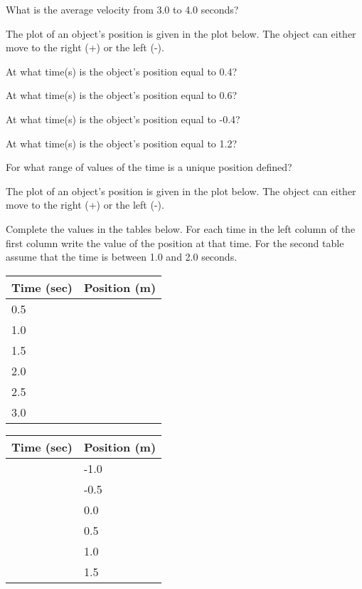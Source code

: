 \begin{problem}
\begin{subproblem}
    \item What is the average velocity from 3.0 to 4.0  seconds?
      \vspace{3em}
    \end{subproblem}

    \clearpage

  \item The plot of an object's position is given in the plot
    below. The object can either move to the right (+) or the left
    (-).

    \scalebox{0.4}{}

    \begin{subproblem}
    \item At what time(s) is the object's position equal to 0.4?
      \vfill
    \item At what time(s) is the object's position equal to 0.6?
      \vfill
    \item At what time(s) is the object's position equal to -0.4?
      \vfill
    \item At what time(s) is the object's position equal to 1.2?
      \vfill
    \item For what range of values of the time is a unique position
      defined?  
      \vfill
    \end{subproblem}

    \clearpage

  \item The plot of an object's position is given in the plot
    below. The object can either move to the right (+) or the left
    (-).

    \scalebox{0.4}{}

    Complete the values in the tables below. For each time in the left
    column of the first column write the value of the position at that
    time. For the second table assume that the time is between 1.0 and
    2.0 seconds.

    \begin{tabular}{l|l}
      Time (sec) & Position (m) \\ \hline
      0.5 & \\ [12pt]
      1.0 & \\  [12pt]
      1.5 & \\  [12pt]
      2.0 & \\  [12pt]
      2.5 & \\  [12pt]
      3.0 
    \end{tabular}

    \begin{tabular}{l|l}
      Time (sec) & Position (m) \\ \hline
       & -1.0 \\ [12pt]
       & -0.5 \\  [12pt]
       &  0.0 \\  [12pt]
       &  0.5 \\  [12pt]
       &  1.0 \\  [12pt]
       &  1.5
    \end{tabular}




\end{problem}


